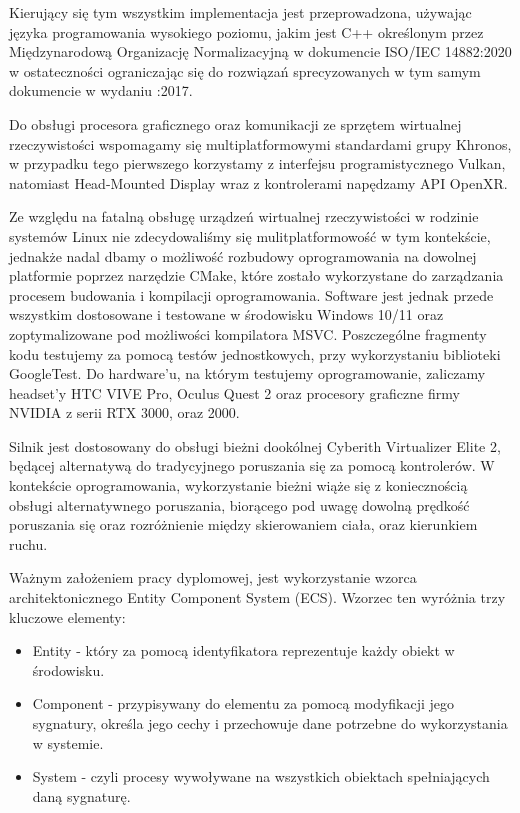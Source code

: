 Kierujący się tym wszystkim implementacja jest przeprowadzona, używając języka programowania wysokiego poziomu, jakim jest C++ określonym przez Międzynarodową Organizację Normalizacyjną w dokumencie ISO/IEC 14882:2020 w ostateczności ograniczając się do rozwiązań sprecyzowanych w tym samym dokumencie w wydaniu :2017. 

Do obsługi procesora graficznego oraz komunikacji ze sprzętem wirtualnej rzeczywistości wspomagamy się multiplatformowymi standardami grupy Khronos, w przypadku tego pierwszego korzystamy z interfejsu programistycznego Vulkan, natomiast Head-Mounted Display wraz z kontrolerami napędzamy API OpenXR. 

Ze względu na fatalną obsługę urządzeń wirtualnej rzeczywistości w rodzinie systemów Linux nie zdecydowaliśmy się mulitplatformowość w tym kontekście, jednakże nadal dbamy o możliwość rozbudowy oprogramowania na dowolnej platformie poprzez narzędzie CMake, które zostało wykorzystane do zarządzania procesem budowania i kompilacji oprogramowania. Software jest jednak przede wszystkim dostosowane i testowane w środowisku Windows 10/11 oraz zoptymalizowane pod możliwości kompilatora MSVC. Poszczególne fragmenty kodu testujemy za pomocą testów jednostkowych, przy wykorzystaniu biblioteki GoogleTest. Do hardware’u, na którym testujemy oprogramowanie, zaliczamy headset’y HTC VIVE Pro, Oculus Quest 2 oraz procesory graficzne firmy NVIDIA z serii RTX 3000, oraz 2000. 

Silnik jest dostosowany do obsługi bieżni dookólnej Cyberith Virtualizer Elite 2, będącej alternatywą do tradycyjnego poruszania się za pomocą kontrolerów. W kontekście oprogramowania, wykorzystanie bieżni wiąże się z koniecznością obsługi alternatywnego poruszania, biorącego pod uwagę dowolną prędkość poruszania się oraz rozróżnienie między skierowaniem ciała, oraz kierunkiem ruchu. 

Ważnym założeniem pracy dyplomowej, jest wykorzystanie wzorca architektonicznego Entity Component System (ECS). Wzorzec ten wyróżnia trzy kluczowe elementy: 

\begin{itemize}
    \item Entity - który za pomocą identyfikatora reprezentuje każdy obiekt w środowisku.
    \item Component - przypisywany do elementu za pomocą modyfikacji jego sygnatury, określa jego cechy i przechowuje dane potrzebne do wykorzystania w systemie. 
    \item System - czyli procesy wywoływane na wszystkich obiektach spełniających daną sygnaturę. 
\end{itemize}

